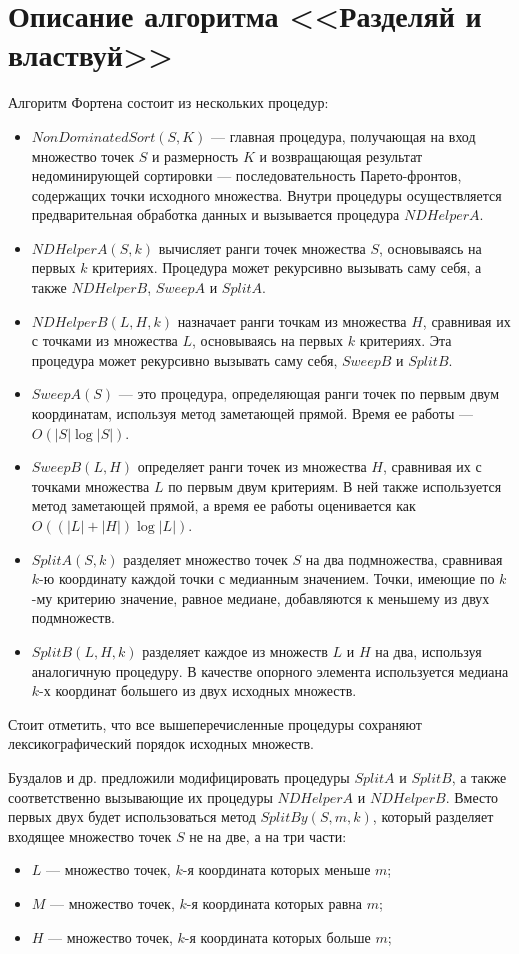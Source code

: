 \section{Описание алгоритма <<Разделяй и властвуй>>}
Алгоритм Фортена состоит из нескольких процедур:
\begin{itemize}
    \item $NonDominatedSort(S, K)$ --- главная процедура, получающая на вход множество точек $S$ и размерность $K$ и возвращающая результат недоминирующей сортировки --- последовательность Парето-фронтов, содержащих точки исходного множества. Внутри процедуры осуществляется предварительная обработка данных и вызывается процедура $NDHelperA$.
    \item $NDHelperA(S, k)$ вычисляет ранги точек множества $S$, основываясь на первых $k$ критериях. Процедура может рекурсивно вызывать саму себя, а также $NDHelperB$, $SweepA$ и $SplitA$.
    \item $NDHelperB(L, H, k)$ назначает ранги точкам из множества $H$, сравнивая их с точками из множества $L$, основываясь на первых $k$ критериях. Эта процедура может рекурсивно вызывать саму себя, $SweepB$ и $SplitB$.
    \item $SweepA(S)$ --- это процедура, определяющая ранги точек по первым двум координатам, используя метод заметающей прямой. Время ее работы --- $O(|S|\log|S|)$.
    \item $SweepB(L, H)$ определяет ранги точек из множества $H$, сравнивая их с точками множества $L$ по первым двум критериям. В ней также используется метод заметающей прямой, а время ее работы оценивается как $O((|L| + |H|)\log{|L|})$.
    \item $SplitA(S, k)$ разделяет множество точек $S$ на два подмножества, сравнивая $k$-ю координату каждой точки с медианным значением. Точки, имеющие по $k$-му критерию значение, равное медиане, добавляются к меньшему из двух подмножеств.
    \item $SplitB(L, H, k)$ разделяет каждое из множеств $L$ и $H$ на два, используя аналогичную процедуру. В качестве опорного элемента используется медиана $k$-х координат большего из двух исходных множеств.
\end{itemize}
Стоит отметить, что все вышеперечисленные процедуры сохраняют лексикографический порядок исходных множеств.

Буздалов и др. предложили модифицировать процедуры $SplitA$ и $SplitB$, а также соответственно вызывающие их процедуры $NDHelperA$ и $NDHelperB$. Вместо первых двух будет использоваться метод $SplitBy(S, m, k)$, который разделяет входящее множество точек $S$ не на две, а на три части:
\begin{itemize}
    \item $L$ --- множество точек, $k$-я координата которых меньше $m$;
    \item $M$ --- множество точек, $k$-я координата которых равна $m$;
    \item $H$ --- множество точек, $k$-я координата которых больше $m$;
\end{itemize}


